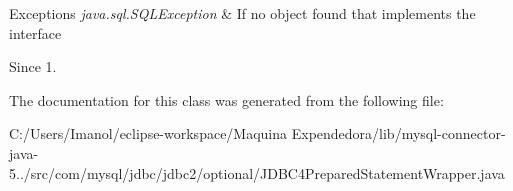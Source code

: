 \begin{DoxyExceptions}{Exceptions}
{\em java.\+sql.\+S\+Q\+L\+Exception} & If no object found that implements the interface \\
\hline
\end{DoxyExceptions}
\begin{DoxySince}{Since}
1. 
\end{DoxySince}


The documentation for this class was generated from the following file\+:\begin{DoxyCompactItemize}
\item 
C\+:/\+Users/\+Imanol/eclipse-\/workspace/\+Maquina Expendedora/lib/mysql-\/connector-\/java-\/5../src/com/mysql/jdbc/jdbc2/optional/J\+D\+B\+C4\+Prepared\+Statement\+Wrapper.\+java\end{DoxyCompactItemize}
